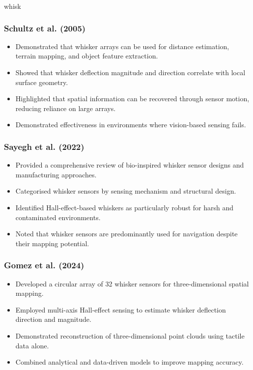 whisk\documentclass[11pt,a4paper]{article}
\begin{document}
\subsubsection{Schultz et al. (2005)}

\begin{itemize}
    \item Demonstrated that whisker arrays can be used for distance estimation, terrain mapping, and object feature extraction.
    \item Showed that whisker deflection magnitude and direction correlate with local surface geometry.
    \item Highlighted that spatial information can be recovered through sensor motion, reducing reliance on large arrays.
    \item Demonstrated effectiveness in environments where vision-based sensing fails.
\end{itemize}

\subsubsection{Sayegh et al. (2022)}

\begin{itemize}
    \item Provided a comprehensive review of bio-inspired whisker sensor designs and manufacturing approaches.
    \item Categorised whisker sensors by sensing mechanism and structural design.
    \item Identified Hall-effect-based whiskers as particularly robust for harsh and contaminated environments.
    \item Noted that whisker sensors are predominantly used for navigation despite their mapping potential.
\end{itemize}

\subsubsection{Gomez et al. (2024)}

\begin{itemize}
    \item Developed a circular array of 32 whisker sensors for three-dimensional spatial mapping.
    \item Employed multi-axis Hall-effect sensing to estimate whisker deflection direction and magnitude.
    \item Demonstrated reconstruction of three-dimensional point clouds using tactile data alone.
    \item Combined analytical and data-driven models to improve mapping accuracy.
\end{itemize}
\end{document}
